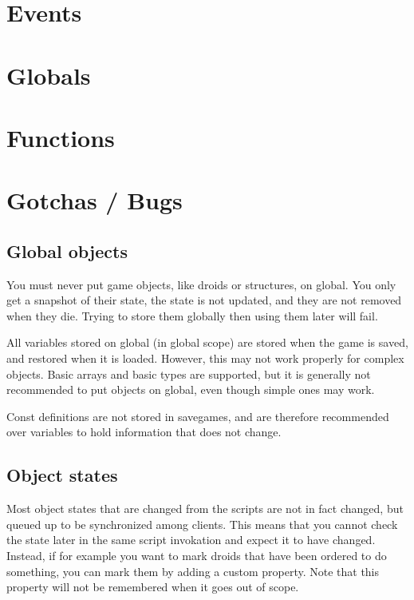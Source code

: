\documentclass[12pt]{article}
\begin{document}


\section{Events}



\section{Globals}

\begin{description}

\end{description}

\section{Functions}



\section{Gotchas / Bugs}

\subsection{Global objects}
You must never put game objects, like droids or structures, on global. You only get a snapshot of their state,
the state is not updated, and they are not removed when they die. Trying to store them globally then using them 
later will fail.

All variables stored on global (in global scope) are stored when the game is saved, and restored when it is 
loaded. However, this may not work properly for complex objects. Basic arrays and basic types are supported,
but it is generally not recommended to put objects on global, even though simple ones may work.

Const definitions are not stored in savegames, and are therefore recommended over variables to hold information 
that does not change.

\subsection{Object states}
Most object states that are changed from the scripts are not in fact changed, but queued up to be synchronized
among clients. This means that you cannot check the state later in the same script invokation and expect it to
have changed. Instead, if for example you want to mark droids that have been ordered to do something, you can
mark them by adding a custom property. Note that this property will not be remembered when it goes out of scope.
\end{document}
